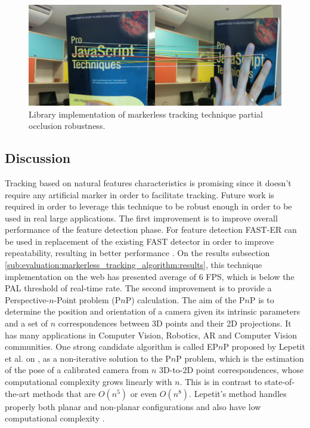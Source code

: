 \begin{figure}[!htb]
  \centering
  \includegraphics[width=\linewidth]{chapters/evaluation/keypoints_occlusion.png}
  \caption{Library implementation of markerless tracking technique partial occlusion robustness.}
  \label{figure:keypoints_occlusion}
\end{figure}



\subsection{Discussion} %
\label{sub:evaluation:markerless_tracking_algorithm:discussion}

Tracking based on natural features characteristics is promising since it doesn't require any artificial marker in order to facilitate tracking. Future work is required in order to leverage this technique to be robust enough in order to be used in real large applications. The first improvement is to improve overall performance of the feature detection phase. For feature detection FAST-ER can be used in replacement of the existing FAST detector in order to improve repeatability, resulting in better performance \cite{RostenFaster2010}. On the results subsection \ref{sub:evaluation:markerless_tracking_algorithm:results}, this technique implementation on the web has presented average of 6 FPS, which is below the PAL threshold of real-time rate. The second improvement is to provide a Perspective-$n$-Point problem (P$n$P) calculation. The aim of the P$n$P is to determine the position and orientation of a camera given its intrinsic parameters and a set of $n$ correspondences between 3D points and their 2D projections. It has many applications in Computer Vision, Robotics, AR and Computer Vision \cite{Hartley2004} communities. One strong candidate algorithm is called EP$n$P proposed by Lepetit et al. on \cite{Lepetit2008}, as a non-iterative solution to the P$n$P problem, which is the estimation of the pose of a calibrated camera from $n$ 3D-to-2D point correspondences, whose computational complexity grows linearly with $n$. This is in contrast to state-of-the-art methods that are $O(n^5)$ or even $O(n^8)$. Lepetit's method handles properly both planar and non-planar configurations and also have low computational complexity \cite{Lepetit2008}.

